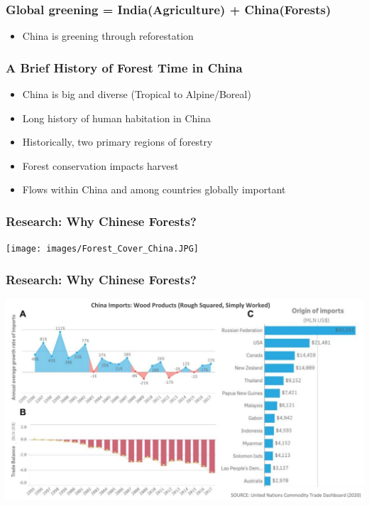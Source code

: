 \documentclass{beamer}
\begin{document}
\begin{frame}
  \frametitle{Global greening = India(Agriculture) + China(Forests)}

  \begin{itemize}
  \item China is greening through reforestation 
  \end{itemize}

\end{frame}

\begin{frame}
  \frametitle{A Brief History of Forest Time in China}

  \begin{itemize}
  \item China is big and diverse (Tropical to Alpine/Boreal)
  \item Long history of human habitation in China
  \item Historically, two primary regions of forestry
  \item Forest conservation impacts harvest
  \item Flows within China and among countries globally important
  \end{itemize}

\end{frame}

\begin{frame}
  \frametitle{Research: Why Chinese Forests?}

\begin{center}\texttt{[image: images/Forest\_Cover\_China.JPG]} \end{center}

\end{frame}

\begin{frame}
  \frametitle{Research: Why Chinese Forests?}

\begin{center}\includegraphics[width=0.5\linewidth]{images/comtrade_china_imports_wood.jpeg} \end{center}

\end{frame}
\end{document}
